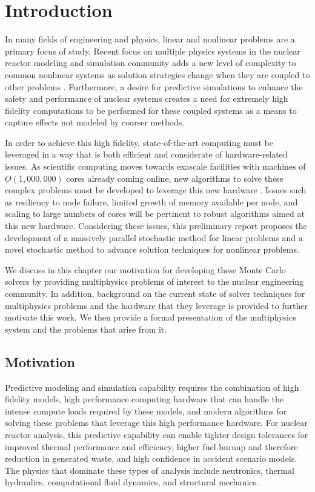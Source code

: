\chapter{Introduction}
\label{ch:introduction}
In many fields of engineering and physics, linear and nonlinear
problems are a primary focus of study. Recent focus on multiple
physics systems in the nuclear reactor modeling and simulation
community adds a new level of complexity to common nonlinear systems
as solution strategies change when they are coupled to other problems
\citep{u.s._department_of_energy_casl_2011}. Furthermore, a desire
for predictive simulations to enhance the safety and performance of
nuclear systems creates a need for extremely high fidelity
computations to be performed for these coupled systems as a means to
capture effects not modeled by coarser methods.

In order to achieve this high fidelity, state-of-the-art computing
 must be leveraged in a way that is both efficient and
considerate of hardware-related issues. As scientific computing moves
towards exascale facilities with machines of $O(1,000,000)$ cores
already coming online, new algorithms to solve these complex problems
must be developed to leverage this new hardware
\citep{kogge_using_2011}. Issues such as resiliency to node failure,
limited growth of memory available per node, and scaling to large
numbers of cores will be pertinent to robust algorithms aimed at this
new hardware. Considering these issues, this preliminary report
proposes the development of a massively parallel stochastic method for
linear problems and a novel stochastic method to advance solution
techniques for nonlinear problems.

We discuss in this chapter our motivation for developing these Monte
Carlo solvers by providing multiphysics problems of interest to the
nuclear engineering community. In addition, background on the current
state of solver techniques for multiphysics problems and the hardware
that they leverage is provided to further motivate this work. We then
provide a formal presentation of the multiphysics system and the
problems that arise from it.

\section{Motivation}
\label{sec:motivation}
Predictive modeling and simulation capability requires the combination
of high fidelity models, high performance computing hardware that can
handle the intense compute loads required by these models, and modern
algorithms for solving these problems that leverage this high
performance hardware. For nuclear reactor analysis, this predictive
capability can enable tighter design tolerances for improved thermal
performance and efficiency, higher fuel burnup and therefore reduction
in generated waste, and high confidence in accident scenario
models. The physics that dominate these types of analysis include
neutronics, thermal hydraulics, computational fluid dynamics, and
structural mechanics. 

